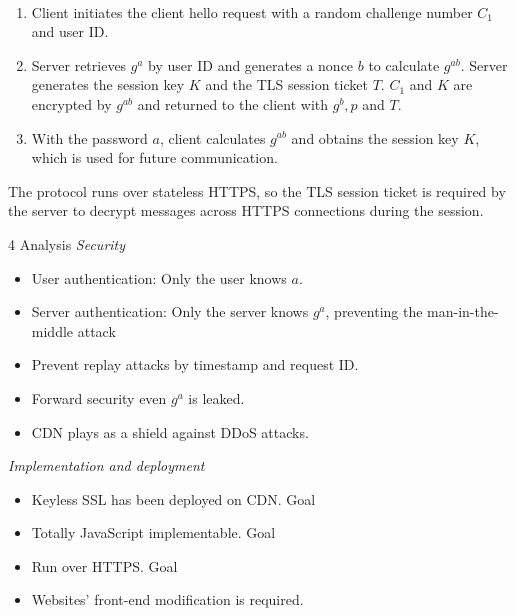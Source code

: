 \documentclass[final]{beamer}
\newlength{\onecolwid}
\newcommand{\vtopsep}[0]{\vspace{0.2ex}}
\newcommand*\circled[1]{\tikz[baseline=(char.base)]{
			\node[shape=circle,draw,inner sep=2pt] (char) {#1};}}
\begin{document}
\begin{frame}[t]
\begin{columns}[t]
		\begin{column}{\onecolwid} %
			\\
			\rmfamily
			\begin{enumerate}
				\item Client initiates the client hello request with a random challenge number $C_1$ and user ID.
				\item Server retrieves $g^a$ by user ID and generates a nonce $b$ to calculate $g^{ab}$. Server generates the session key $K$ and the TLS session ticket $T$. $C_1$ and $K$ are encrypted by $g^{ab}$ and returned to the client with $g^b, p$ and $T$.
				\item With the password $a$, client calculates $g^{ab}$ and obtains the session key $K$, which is used for future communication.
			\end{enumerate}
			The protocol runs over stateless HTTPS, so the TLS session ticket is required by the server to decrypt messages across HTTPS connections during the session.
			\vspace{3ex}
																		
			\begin{block}{4 Analysis}
				\textit{Security}
				\vtopsep
				\begin{itemize}
					\item User authentication: Only the user knows $a$.
					\item Server authentication: Only the server knows $g^a$, preventing the man-in-the-middle attack
					\item Prevent replay attacks by timestamp and request ID.
					\item Forward security even $g^a$ is leaked. 
					\item CDN plays as a shield against DDoS attacks.
				\end{itemize}
				\vtopsep
				\textit{Implementation and deployment}
				\vtopsep
				\begin{itemize}
					\item Keyless SSL has been deployed on CDN. Goal~\circled{3} \checkmark 
					\item Totally JavaScript implementable. Goal~\circled{3} \checkmark
					\item Run over HTTPS. Goal~\circled{4} \checkmark
					\item Websites' front-end modification is required.
				\end{itemize}
				\vtopsep
			\end{block}
																		

\end{column}
\end{columns}
\end{frame}
\end{document}
